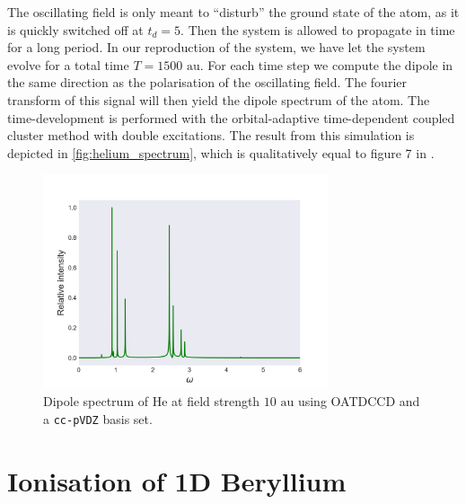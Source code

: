 The oscillating field is only meant to ``disturb'' the ground state of the atom,
as it is quickly 
switched off at $t_d=5$. Then the system is allowed to propagate in time for 
a long period. In our reproduction of the system, we have let the system 
evolve for a total time $T=1500 \text{ au}$. For each time step we compute the 
dipole in the same direction as the polarisation of the oscillating field. The 
fourier transform of this signal will then yield the dipole spectrum of the 
atom. The time-development is performed with the orbital-adaptive time-dependent 
coupled cluster method with double excitations. The result from this simulation is 
depicted in \autoref{fig:helium_spectrum}, which is qualitatively equal to figure 
7 in \citeauthor{pedersen2019symplectic}\cite{pedersen2019symplectic}.

\begin{figure}
    \centering
    \includegraphics[width=0.75\textwidth]{results/figures/helium_spectrum.png} 
    \caption{Dipole spectrum of He at field strength $10\text{ au}$ using 
        OATDCCD and a \lstinline{cc-pVDZ} basis set.      
    }
    \label{fig:helium_spectrum}
\end{figure}


\section{Ionisation of 1D Beryllium}

